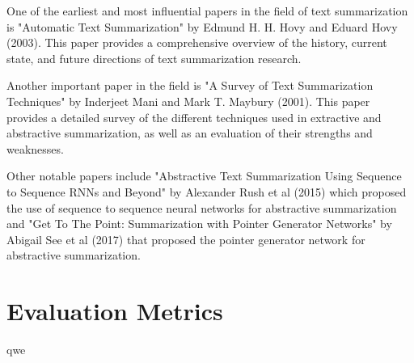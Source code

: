 One of the earliest and most influential papers in the field of text summarization is "Automatic Text Summarization" by Edmund H. H. Hovy and Eduard Hovy (2003). This paper provides a comprehensive overview of the history, current state, and future directions of text summarization research.

Another important paper in the field is "A Survey of Text Summarization Techniques" by Inderjeet Mani and Mark T. Maybury (2001). This paper provides a detailed survey of the different techniques used in extractive and abstractive summarization, as well as an evaluation of their strengths and weaknesses.

Other notable papers include "Abstractive Text Summarization Using Sequence to Sequence RNNs and Beyond" by Alexander Rush et al (2015) which proposed the use of sequence to sequence neural networks for abstractive summarization and "Get To The Point: Summarization with Pointer Generator Networks" by Abigail See et al (2017) that proposed the pointer generator network for abstractive summarization.

\section{Evaluation Metrics}
qwe
